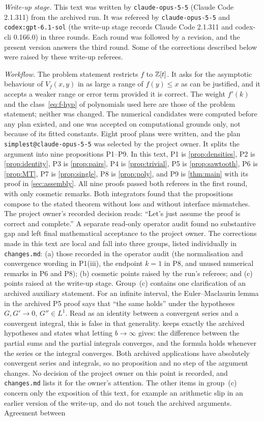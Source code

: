 \emph{Write-up stage.} This text was written by \texttt{claude-opus-5-5} (Claude Code 2.1.311) from the archived run. It was refereed by \texttt{claude-opus-5-5} and \texttt{codex:gpt-6.1-sol} (the write-up stage records Claude Code 2.1.311 and codex-cli 0.166.0) in three rounds. Each round was followed by a revision, and the present version answers the third round. Some of the corrections described below were raised by these write-up referees.

\emph{Workflow.} The problem statement restricts $f$ to $\mathbb{Z}[t]$. It asks for the asymptotic behaviour of $V_f(x,y)$ in as large a range of $f(y)\le x$ as can be justified, and it accepts a weaker range or error term provided it is correct. The weight $f'(k)$ and the class~\eqref{eq:f-hyp} of polynomials used here are those of the problem statement; neither was changed. The numerical candidates were computed before any plan existed, and one was accepted on computational grounds only, not because of its fitted constants. Eight proof plans were written, and the plan \texttt{simplest@claude-opus-5-5} was selected by the project owner. It splits the argument into nine propositions P1--P9. In this text, P1 is \cref{prop:densities}, P2 is \cref{prop:identity}, P3 is \cref{prop:pairs}, P4 is \cref{prop:trivial}, P5 is \cref{prop:sawtooth}, P6 is \cref{prop:MT}, P7 is \cref{prop:single}, P8 is \cref{prop:poly}, and P9 is \cref{thm:main} with its proof in \cref{sec:assembly}. All nine proofs passed both referees in the first round, with only cosmetic remarks. Both integrators found that the propositions compose to the stated theorem without loss and without interface mismatches. The project owner's recorded decision reads: ``Let's just assume the proof is correct and complete.'' A separate read-only operator audit found no substantive gap and left final mathematical acceptance to the project owner. The corrections made in this text are local and fall into three groups, listed individually in \texttt{changes.md}: (a) those recorded in the operator audit (the normalisation and convergence wording in P1(iii), the endpoint $k=1$ in P8, and unused numerical remarks in P6 and P8); (b) cosmetic points raised by the run's referees; and (c) points raised at the write-up stage. Group~(c) contains one clarification of an archived auxiliary statement. For an infinite interval, the Euler--Maclaurin lemma in the archived P5 proof says that ``the same holds'' under the hypotheses $G,G'\to0$, $G''\in L^1$. Read as an identity between a convergent series and a convergent integral, this is false in that generality.  keeps exactly the archived hypotheses and states what letting $b\to\infty$ gives: the difference between the partial sums and the partial integrals converges, and the formula holds whenever the series or the integral converges. Both archived applications have absolutely convergent series and integrals, so no proposition and no step of the argument changes. No decision of the project owner on this point is recorded, and \texttt{changes.md} lists it for the owner's attention. The other items in group~(c) concern only the exposition of this text, for example an arithmetic slip in an earlier version of the write-up, and do not touch the archived arguments. Agreement between 